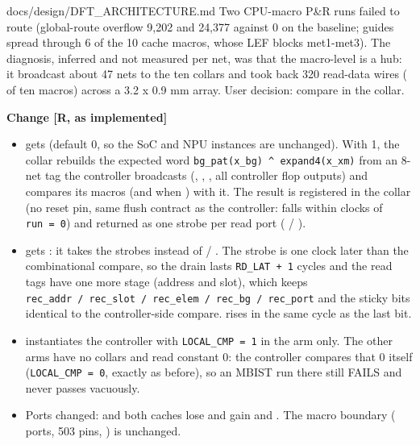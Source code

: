 \begin{relocated}{docs/design/DFT_ARCHITECTURE.md}
Two CPU-macro P\&R runs failed to route (global-route overflow 9,202 and
24,377 against 0 on the baseline; guides spread through 6 of the 10
cache macros, whose LEF blocks met1-met3). The diagnosis, inferred and
not measured per net, was that the macro-level  is a
hub: it broadcast about 47 nets to the ten collars and took back 320
read-data wires ( of ten macros) across a 3.2 x 0.9 mm
array. User decision: compare in the collar.

\textbf{Change {[}R, as implemented{]}}

\begin{itemize}
\tightlist
\item
   gets  (default 0, so the SoC
   and NPU instances are unchanged). With 1, the
  collar rebuilds the expected word
  \texttt{bg\_\allowbreak{}pat(x\_\allowbreak{}bg)\ \textasciicircum{}\ expand4(x\_\allowbreak{}xm)}
  from an 8-net tag the controller broadcasts (,
  , , all controller flop outputs) and
  compares its macro\textquotesingle s  (and 
  when ) with it. The result is registered in the collar
  (no reset pin, same flush contract as the controller: 
  falls within  clocks of \texttt{run\ =\allowbreak{}\ 0})
  and returned as one strobe per read port ( /
  ).
\item
   gets : it takes the strobes instead
  of  / . The strobe is one clock later than
  the combinational compare, so the drain lasts
  \texttt{RD\_\allowbreak{}LAT\ +\allowbreak{}\ 1} cycles and the read
  tags have one more stage (address and slot), which keeps
  \texttt{rec\_\allowbreak{}addr\ /\allowbreak{}\ rec\_\allowbreak{}slot\ /\allowbreak{}\ rec\_\allowbreak{}elem\ /\allowbreak{}\ rec\_\allowbreak{}bg\ /\allowbreak{}\ rec\_\allowbreak{}port}
  and the sticky  bits identical to the controller-side
  compare.  rises in the same cycle as the last 
  bit.
\item
   instantiates the controller with
  \texttt{LOCAL\_\allowbreak{}CMP\ =\allowbreak{}\ 1} in the
   arm only. The other arms have no collars and read
  constant 0: the controller compares that 0 itself
  (\texttt{LOCAL\_\allowbreak{}CMP\ =\allowbreak{}\ 0}, exactly as
  before), so an MBIST run there still FAILS and never passes vacuously.
\item
  Ports changed:  and both caches lose
   and gain  and
  . The macro boundary (
  ports, 503 pins, ) is unchanged.
\end{itemize}


\end{relocated}
